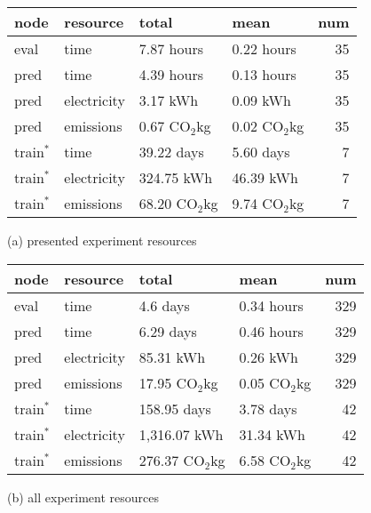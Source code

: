 \documentclass[10pt,twocolumn,letterpaper]{article}
\newcommand{\cotwo}{\ensuremath{\mathrm{CO_2}}}
\begin{document}
\begin{table}[t]
    \centering
\begin{tabular}{llllr}
\toprule
        node & resource &           total &            mean &  num \\
\midrule
eval        & time         & 7.87 hours     &  0.22 hours     &   35 \\
\rule{0pt}{2ex}%
pred        & time         & 4.39 hours     &  0.13 hours     &   35 \\
pred        & electricity  & 3.17 kWh       &  0.09 kWh       &   35 \\
pred        & emissions    & 0.67 \cotwo kg &  0.02 \cotwo kg &   35 \\
\rule{0pt}{2ex}%
train$^{*}$ & time         & 39.22 days      & 5.60 days      &   7 \\
train$^{*}$ & electricity  & 324.75 kWh      & 46.39 kWh      &   7 \\
train$^{*}$ & emissions    & 68.20 \cotwo kg & 9.74 \cotwo kg &   7 \\
\bottomrule
\end{tabular}
(a) presented experiment resources
\begin{tabular}{llllr}
\toprule
        node & resource &           total &            mean &  num \\
\midrule
eval        & time        & 4.6 days        & 0.34 hours     &  329 \\
\rule{0pt}{2ex}%
pred        & time        & 6.29 days       & 0.46 hours     &  329 \\
pred        & electricity & 85.31 kWh       & 0.26 kWh       &  329 \\
pred        & emissions   & 17.95 \cotwo kg & 0.05 \cotwo kg &  329 \\
\rule{0pt}{2ex}%
train$^{*}$ & time        & 158.95 days      &     3.78 days  &   42 \\
train$^{*}$ & electricity & 1,316.07 kWh      &     31.34 kWh  &   42 \\
train$^{*}$ & emissions   & 276.37 \cotwo kg & 6.58 \cotwo kg &   42 \\
\bottomrule
\end{tabular}
(b) all experiment resources

\end{table}
\end{document}
